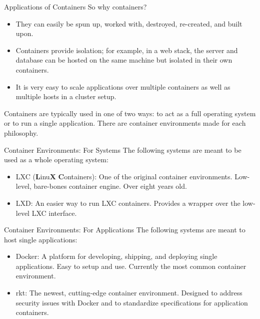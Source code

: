 \documentclass[xcolor=dvipsnames,aspectratio=1610]{beamer}
\begin{document}
  \begin{frame}{Applications of Containers}
    So why containers?

    \begin{itemize}
        \item They can easily be spun up, worked with, destroyed, re-created, and built upon.
        \item Containers provide isolation; for example, in a web stack, the server and database can be hosted on the same machine but isolated in their own containers.
        \item It is very easy to scale applications over multiple containers as well as multiple hosts in a cluster setup.
    \end{itemize}

    \vspace{10px}

    Containers are typically used in one of two ways: to act as a full operating system or to run a single application. There are container environments made for each philosophy.
  \end{frame}

  \begin{frame}{Container Environments: For Systems}
      The following systems are meant to be used as a whole operating system: \newline
      \begin{itemize}
          \setlength\itemsep{1.6em}
          \item \alert{LXC} (\textbf{L}inu\textbf{X} \textbf{C}ontainers): One of the original container environments. Low-level, bare-bones container engine. Over eight years old.
          \item \alert{LXD}: An easier way to run LXC containers. Provides a wrapper over the low-level LXC interface.
      \end{itemize}
  \end{frame}

  \begin{frame}{Container Environments: For Applications}
      The following systems are meant to host single applications: \newline
      \begin{itemize}
          \setlength\itemsep{1.6em}
          \item \alert{Docker}: A platform for developing, shipping, and deploying single applications. Easy to setup and use. Currently the most common container environment.
          \item \alert{rkt}: The newest, cutting-edge container environment. Designed to address security issues with Docker and to standardize specifications for application containers.
      \end{itemize}
  \end{frame}
\end{document}

